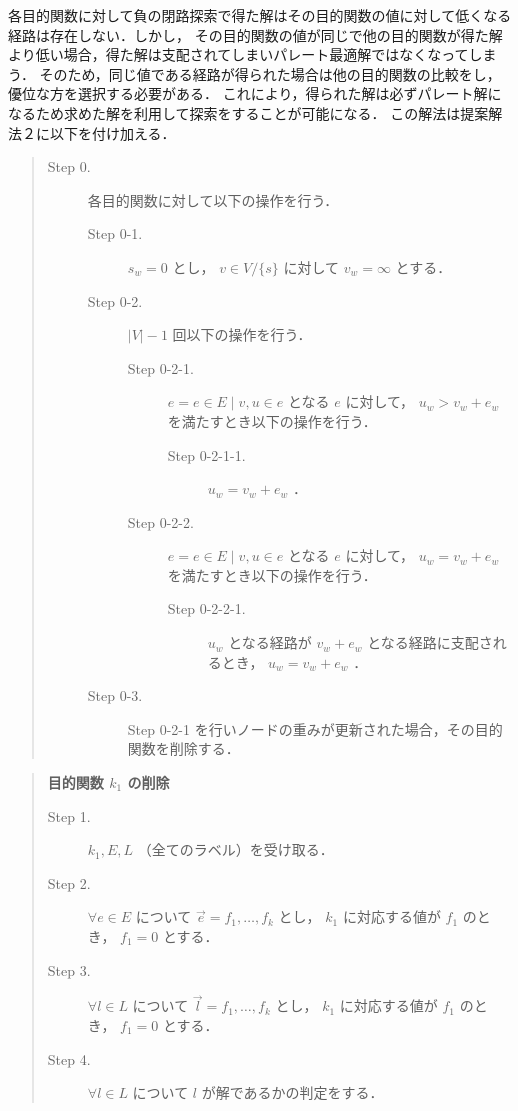 \documentclass[12pt]{optlab-bachelor}
\begin{document}
各目的関数に対して負の閉路探索で得た解はその目的関数の値に対して低くなる経路は存在しない．しかし，
その目的関数の値が同じで他の目的関数が得た解より低い場合，得た解は支配されてしまいパレート最適解ではなくなってしまう．
そのため，同じ値である経路が得られた場合は他の目的関数の比較をし，優位な方を選択する必要がある．
これにより，得られた解は必ずパレート解になるため求めた解を利用して探索をすることが可能になる．
この解法は提案解法２に以下を付け加える．

\begin{quote}
  \begin{description}
    \item[Step 0.] 各目的関数に対して以下の操作を行う．
    \begin{description}
      \item[Step 0-1.] $s_w = 0$ とし， $v \in V/\{s\}$ に対して $v_w = \infty$ とする．
      \item[Step 0-2.] $|V|-1$ 回以下の操作を行う．
      \begin{description}
        \item[Step 0-2-1.] $e = {e \in E \mid v,u \in e}$ となる $e$ に対して，
        $u_w > v_w + e_w$ を満たすとき以下の操作を行う．
        \begin{description}
          \item[Step 0-2-1-1.] $u_w = v_w + e_w$ ．
        \end{description}
        \item[Step 0-2-2.] $e = {e \in E \mid v,u \in e}$ となる $e$ に対して，
        $u_w = v_w + e_w$ を満たすとき以下の操作を行う．
        \begin{description}
          \item[Step 0-2-2-1.] $u_w$ となる経路が $v_w + e_w$ となる経路に支配されるとき，
          $u_w = v_w + e_w$ ．
        \end{description}
      \end{description}
      \item[Step 0-3.] Step 0-2-1 を行いノードの重みが更新された場合，その目的関数を削除する．
    \end{description}
  \end{description}
\end{quote}

\begin{quote}
  \textbf{目的関数 $k_1$ の削除}
  \begin{description}
    \item[Step 1.] $k_1,E,L$ （全てのラベル）を受け取る．
    \item[Step 2.] $\forall e \in E$ について $\vec{e}={f_1,\ldots,f_k}$ とし， $k_1$ に対応する値が
    $f_1$ のとき， $f_1=0$ とする．
    \item[Step 3.] $\forall l \in L$ について $\vec{l}={f_1,\ldots,f_k}$ とし， $k_1$ に対応する値が
    $f_1$ のとき， $f_1=0$ とする．
    \item[Step 4.] $\forall l \in L$ について $l$ が解であるかの判定をする．
  \end{description}
\end{quote}
\end{document}
